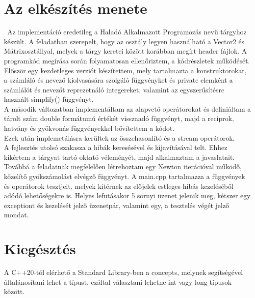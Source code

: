 \documentclass[a4paper, 12pt]{article}
\begin{document}
\section{Az elkészítés menete}
\ Az implementáció eredetileg a Haladó Alkalmazott Programozás nevű tárgyhoz készült.
A feladatban szerepelt, hogy az osztály legyen használható a Vector2 és Mátrixosztállyal, melyek a tárgy keretei között korábban megírt header fájlok.
\newline
\newline
\indent A programkód megírása során folyamatosan ellenőriztem, a kódrészletek működését.
Először egy kezdetleges verziót készítettem, mely tartalmazta a konstruktorokat, a számláló és nevező kiolvasására szolgáló függvényket és private elemként a számlálót és nevezőt reprezetnáló integereket, valamint az egyszerűsítésre használt simplify() függvényt. 
\\
\indent A második változatban implementáltam az alapvető operátorokat és definiáltam a tárolt szám double formátumú értékét visszaadó függvényt, majd a reciprok, hatvány és gyökvonás függvényekkel bővítettem a kódot.
\\
\indent Ezek után implemetálásra kerültek az összehasonlító és a stream operátorok.
\\
\indent A fejlesztés utolsó szakasza a hibák keresésével és kijavításával telt. Ehhez kikértem a tárgyat tartó oktató véleményét, majd alkalmaztam a javaslatait. Továbbá a feladatnak megfelelően létrehoztam egy Newton iterációval működő, közelítő gyökszámolást elvégző függvényt. A main.cpp tartalmazza a függvények és operátorok tesztjeit, melyek kitérnek az előjelek estleges hibás kezeléséből adódó lehetőségekre is.
Helyes lefutásakor 5 sornyi üzenet jelenik meg, kétszer egy exceptiont és kezelését jelző üzenetpár, valamint egy, a tesztelés végét 
jelző mondat.

\section{Kiegésztés}
A C++20-tól elérhető a Standard Library-ben a concepts, melynek segítségével általánosítani lehet a típust, ezáltal választani lehetne int vagy long típusok között.
\end{document}
